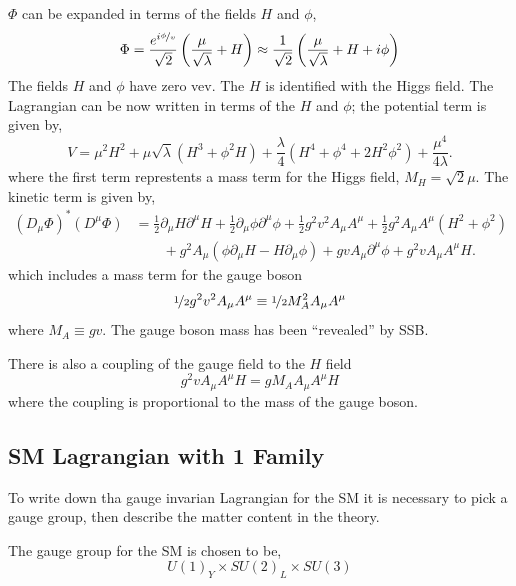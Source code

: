 $\Phi$ can be expanded in terms of the fields $H$ and $\phi$,
\begin{equation}
\Phi 
= \frac{e^{i\nicefrac{\phi}{v}}}{\sqrt{2}}
\left( \frac{\mu}{\sqrt{\lambda}} + H \right)
\approx \frac{1}{\sqrt{2}} \left( \frac{\mu}{\sqrt{\lambda}} + H +i\phi \right)
\end{equation}
The fields $H$ and $\phi$ have zero \ac{vev}.  The $H$ is identified with the
Higgs field.  The Lagrangian can be now written in terms of the $H$ and $\phi$;
the potential term is given by,
\begin{equation}
V = \mu^{2}H^{2}
+ \mu \sqrt{\lambda} (H^{3}+\phi^{2}H)
+ \frac{\lambda}{4} (H^{4}+\phi^{4} + 2H^{2}\phi^{2})
+ \frac{\mu^{4}}{4\lambda} .
\end{equation}
where the first term represtents a mass term for the Higgs field,
$M_{H}=\sqrt{2}\mu$.
The kinetic term is given by,
\begin{align}
(D_{\mu}\Phi)^{\ast} (D^{\mu}\Phi)
&= \frac{1}{2}\partial_{\mu}H\partial^{\mu}H
+ \frac{1}{2}\partial_{\mu}\phi\partial^{\mu}\phi
+ \frac{1}{2}g^{2}v^{2}A_{\mu}A^{\mu}
+ \frac{1}{2}g^{2}A_{\mu}A^{\mu}(H^{2}+\phi^{2}) \nonumber \\
&\qquad {} + g^{2}A_{\mu}(\phi\partial_{\mu}H - H\partial_{\mu}\phi)
+ g v A_{\mu}\partial^{\mu}\phi
+ g^{2} v A_{\mu}A^{\mu}H.
\end{align}
which includes a mass term for the gauge boson
\begin{equation}
\nicefrac{1}{2}g^{2}v^{2}A_{\mu}A^{\mu} 
\equiv \nicefrac{1}{2} M_{A}^{2}A_{\mu}A^{\mu} 
\end{equation}
where $M_{A}\equiv gv$.
The gauge boson mass has been ``revealed'' by \ac{SSB}.

There is also a coupling of the gauge field to the $H$ field
\begin{equation}
g^{2}vA_{\mu}A^{\mu} H = 
g M_{A} A_{\mu}A^{\mu} H 
\end{equation}
where the coupling is proportional to the mass of the gauge boson.

\subsection{SM Lagrangian with 1 Family}
\label{sec:EWK}
To write down tha gauge invarian Lagrangian for the \ac{SM} it is necessary to
pick a gauge group, then describe the matter content in the theory. 


The gauge group for the \ac{SM} is chosen to be,
\begin{equation}
U(1)_{Y} \times SU(2)_{L} \times SU(3)
\end{equation}

